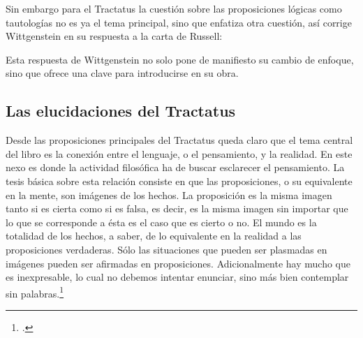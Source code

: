     Sin embargo para el Tractatus la cuestión sobre las proposiciones lógicas como
    tautologías no es ya el tema principal, sino que enfatiza otra cuestión, así
    corrige Wittgenstein en su respuesta a la carta de Russell:

    Esta respuesta de Wittgenstein no solo pone de manifiesto su cambio de enfoque,
    sino que ofrece una clave para introducirse en su obra. 

    \subsection{Las elucidaciones del Tractatus}
    Desde las proposiciones principales del Tractatus queda claro que el tema
    central del libro es la conexión entre el lenguaje, o el pensamiento, y la
    realidad.  
    En este nexo es donde la actividad filosófica ha de buscar esclarecer el
    pensamiento.
    La tesis básica sobre esta relación consiste en que las proposiciones, o su
    equivalente en la mente, son imágenes de los hechos.
    La proposición es la misma imagen tanto si es cierta como si es falsa, es decir,
    es la misma imagen sin importar que lo que se corresponde a ésta es el caso que
    es cierto o no. El mundo es la totalidad de los hechos, a saber, de lo
    equivalente en la realidad a las proposiciones verdaderas.
    Sólo las situaciones que pueden ser plasmadas en imágenes pueden ser afirmadas
    en proposiciones. Adicionalmente hay mucho que es inexpresable, lo cual no
    debemos intentar enunciar, sino más bien contemplar sin palabras.\footcite[cf.
    p.19]{IWT}

